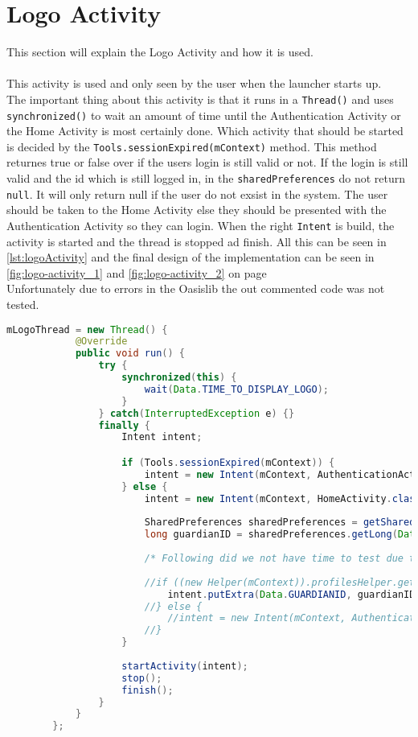 \section{Logo Activity}
This section will explain the Logo Activity and how it is used.\\\\
This activity is used and only seen by the user when the launcher starts up.\\
The important thing about this activity is that it runs in a \verb+Thread()+ and uses \verb+synchronized()+ to wait an amount of time until the Authentication Activity or the Home Activity is most certainly done. Which activity that should be started is decided by the \verb+Tools.sessionExpired(mContext)+ method. This method returnes true or false over if the users login is still valid or not. If the login is still valid and the id which is still logged in, in the \verb+sharedPreferences+ do not return \verb+null+. It will only return null if the user do not exsist in the system. The user should be taken to the Home Activity else they should be presented with the Authentication Activity so they can login. When the right \verb+Intent+ is build, the activity is started and the thread is stopped ad finish.
All this can be seen in \autoref{lst:logoActivity} and the final design of the implementation can be seen in \autoref{fig:logo-activity_1} and \autoref{fig:logo-activity_2} on page \\
Unfortunately due to errors in the Oasislib the out commented code was not tested.

\begin{lstlisting}[style=sourceCode, language=JAVA, caption=The Logo Activity and how it uses Thread and synchronized, label=lst:logoActivity] 
		mLogoThread = new Thread() {
	        @Override
	        public void run() {
	            try {
	            	synchronized(this) {
	            		wait(Data.TIME_TO_DISPLAY_LOGO);
	            	}
	            } catch(InterruptedException e) {}
	            finally {
	            	Intent intent;

	            	if (Tools.sessionExpired(mContext)) {
	            		intent = new Intent(mContext, AuthenticationActivity.class);
	            	} else {
	            		intent = new Intent(mContext, HomeActivity.class);
	            		
	            		SharedPreferences sharedPreferences = getSharedPreferences(Data.TIMERKEY, 0);
	            		long guardianID = sharedPreferences.getLong(Data.GUARDIANID, -1);
	            		
	            		/* Following did we not have time to test due to errors in the Oasislib */
	            		
	            		//if ((new Helper(mContext)).profilesHelper.getProfileById(guardianID) != null) {
	            			intent.putExtra(Data.GUARDIANID, guardianID);
	            		//} else {
	            			//intent = new Intent(mContext, AuthenticationActivity.class);
	            		//}
	            	}
	            	
	                startActivity(intent);
	                stop();
	                finish();
	            }
	        }
	    };
\end{lstlisting}